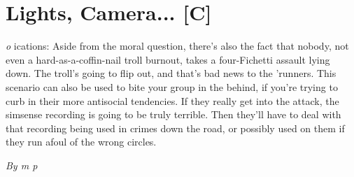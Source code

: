 \documentclass[letterpaper,twocolumn,10.5pt]{article}
\newenvironment{scenario}[6]
	{
		\section{#1 {\small[#2]}}
		\textit{#3}
		\def\TMPSCENARIO{#4 #5}
	}
	{\small\textit{By \TMPSCENARIO}}
\begin{document}
\begin{scenario}{Lights, Camera...}
Complications: Aside from the moral question, there's also the fact that nobody, not even a hard-as-a-coffin-nail troll burnout, takes a four-Fichetti assault lying down. The troll's going to flip out, and that's bad news to the 'runners. This scenario can also be used to bite your group in the behind, if you're trying to curb in their more antisocial tendencies. If they really get into the attack, the simsense recording is going to be truly terrible. Then they'll have to deal with that recording being used in crimes down the road, or possibly used on them if they run afoul of the wrong circles. 

\end{scenario}
\end{document}
